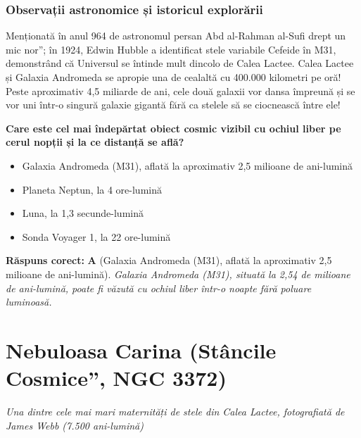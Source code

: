 \subsubsection*{Observații astronomice și istoricul explorării}
Menționată în anul 964 de astronomul persan Abd al-Rahman al-Sufi drept \quotedblbase{}un mic nor\textquotedblright{}; în 1924, Edwin Hubble a identificat stele variabile Cefeide în M31, demonstrând că Universul se întinde mult dincolo de Calea Lactee. Calea Lactee și Galaxia Andromeda se apropie una de cealaltă cu 400.000 kilometri pe oră! Peste aproximativ 4,5 miliarde de ani, cele două galaxii vor dansa împreună și se vor uni într-o singură galaxie gigantă fără ca stelele să se ciocnească între ele!

\vspace{6pt}
\begin{tcolorbox}[orbitarquiz, title={\textbf{Întrebare de verificare \#66: Galaxia Andromeda (M31)}}]
\textbf{Care este cel mai îndepărtat obiect cosmic vizibil cu ochiul liber pe cerul nopții și la ce distanță se află?}
\begin{itemize}[leftmargin=2.2em, itemsep=2pt, topsep=4pt]
  \item[$\square$ \textbf{A.}] Galaxia Andromeda (M31), aflată la aproximativ 2,5 milioane de ani-lumină
  \item[$\square$ \textbf{B.}] Planeta Neptun, la 4 ore-lumină
  \item[$\square$ \textbf{C.}] Luna, la 1,3 secunde-lumină
  \item[$\square$ \textbf{D.}] Sonda Voyager 1, la 22 ore-lumină
\end{itemize}
\vspace{2pt}
{\footnotesize\color{orbitarMuted}\textbf{Răspuns corect:} \textbf{A} (Galaxia Andromeda (M31), aflată la aproximativ 2,5 milioane de ani-lumină). \emph{Galaxia Andromeda (M31), situată la 2,54 de milioane de ani-lumină, poate fi văzută cu ochiul liber într-o noapte fără poluare luminoasă.}}
\end{tcolorbox}
\clearpage


\section{Nebuloasa Carina (\quotedblbase{}Stâncile Cosmice\textquotedblright{}, NGC 3372)}
\label{sec:body-carina_nebula}
\vspace{-4pt}
{\large\itshape\color{orbitarAccent} Una dintre cele mai mari maternități de stele din Calea Lactee, fotografiată de James Webb (7.500 ani-lumină)}\\[4pt]



